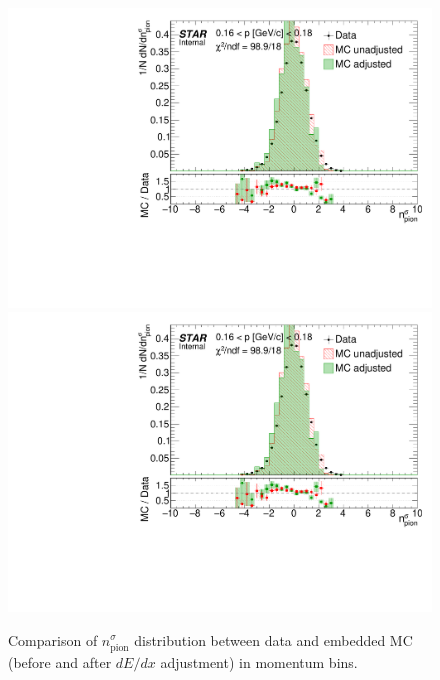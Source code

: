 % 
% 
% 
% 
% 
% 
% 
% 
% 
% 
% 
% 
% 
% 
\begin{figure}[ht]
\centering%
\caption[Comparison of $n^{\sigma}_{\text{pion}}$ distribution between data and embedded MC in momentum bins.]{Comparison of $n^{\sigma}_{\text{pion}}$ distribution between data and embedded MC (before and after $dE/dx$ adjustment) in momentum bins.}\label{fig:dEdxDataVsMC}
\parbox{0.495\textwidth}{
  \centering
  \includegraphics[width=\linewidth,page=2]{graphics/dedx/nSigmaPion_DataVsMC.pdf}\\[3pt]
  \includegraphics[width=\linewidth,page=4]{graphics/dedx/nSigmaPion_DataVsMC.pdf}\\[3pt]
}
\end{figure}
